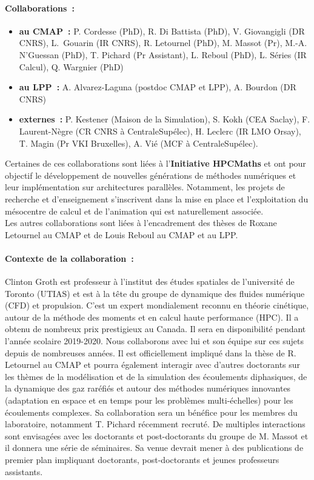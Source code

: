 \documentclass[12pt]{article}
\begin{document}
\paragraph{Collaborations~:} \begin{itemize}
\item \textbf{au CMAP~:} P. Cordesse (PhD), R. Di Battista (PhD), V. Giovangigli (DR CNRS), L.~Gouarin (IR CNRS), R. Letournel (PhD), M. Massot (Pr), M.-A. N'Guessan (PhD), T. Pichard (Pr Assistant),  L. Reboul (PhD), L. S\'eries (IR Calcul), Q. Wargnier (PhD)
\item \textbf{au LPP~:} A. Alvarez-Laguna (postdoc CMAP et LPP), A. Bourdon (DR CNRS)
\item \textbf{externes~:} P. Kestener (Maison de la Simulation), S. Kokh (CEA Saclay), F. Laurent-Nègre (CR CNRS à CentraleSupélec), H. Leclerc (IR LMO Orsay), T. Magin (Pr VKI Bruxelles), A. Vié (MCF à CentraleSupélec).
\end{itemize}
Certaines de ces collaborations sont liées à l'\textbf{Initiative HPC\at{}Maths} et ont pour objectif le développement de nouvelles générations de méthodes numériques et leur implémentation sur architectures parallèles. Notamment, les projets de recherche et d'enseignement s'inscrivent dans la mise en place et l'exploitation du mésocentre de calcul et de l'animation qui est naturellement associée. \\
Les autres collaborations sont liées à l'encadrement des thèses de Roxane Letournel au CMAP et de Louis Reboul au CMAP et au LPP.

\paragraph{Contexte de la collaboration~:} Clinton Groth est professeur à l'institut des études spatiales de l'université de Toronto (UTIAS) et est à la tête du groupe de dynamique des fluides numérique (CFD) et propulsion. C'est un expert mondialement reconnu en théorie cinétique, autour de la méthode des moments et en calcul haute performance (HPC). Il a obtenu de nombreux prix prestigieux au Canada. Il sera en disponibilité pendant l'année scolaire 2019-2020. Nous collaborons avec lui et son équipe sur ces sujets depuis de nombreuses années. Il est officiellement impliqué dans la thèse de R. Letournel au CMAP et pourra également interagir avec d'autres doctorants sur les thèmes de la modélisation et de la simulation des écoulements diphasiques, de la dynamique des gaz raréfiés et autour des méthodes numériques innovantes (adaptation en espace et en temps pour les problèmes multi-échelles) pour les écoulements complexes. Sa collaboration sera un bénéfice pour les membres du laboratoire, notamment T. Pichard récemment recruté. De multiples interactions sont envisagées avec les doctorants et post-doctorants du groupe de M. Massot et il donnera une série de séminaires. Sa venue devrait mener à des publications de premier plan impliquant doctorants, post-doctorants et jeunes professeurs assistants. 
\end{document}
